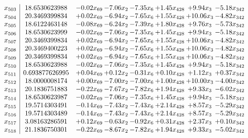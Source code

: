 \documentclass[8pt]{article}
\begin{document}
\[\begin{array}{c| c c@{\hskip 2pt} c@{\hskip 2pt} c@{\hskip 2pt} c@{\hskip 2pt} c@{\hskip 2pt} c@{\hskip 2pt} }
 x_{503}   &  18.6530623988 & -0.02 x_{69} & -7.06 x_{2} & -7.35 x_{6} & +  1.45 x_{428} & +  9.94 x_{3} & -5.18 x_{342}\\
 x_{504}   &  20.3469399834 & +  0.02 x_{69} & -6.94 x_{2} & -7.65 x_{6} & +  1.55 x_{428} & + 10.06 x_{3} & -4.82 x_{342}\\
 x_{505}   &  18.6122463148 & -0.08 x_{69} & -6.24 x_{2} & -7.39 x_{6} & +  1.80 x_{428} & +  9.76 x_{3} & -5.73 x_{342}\\
 x_{506}   &  18.6530623999 & -0.02 x_{69} & -7.06 x_{2} & -7.35 x_{6} & +  1.45 x_{428} & +  9.94 x_{3} & -5.18 x_{342}\\
 x_{507}   &  20.3469399834 & +  0.02 x_{69} & -6.94 x_{2} & -7.65 x_{6} & +  1.55 x_{428} & + 10.06 x_{3} & -4.82 x_{342}\\
 x_{508}   &  20.3469400223 & +  0.02 x_{69} & -6.94 x_{2} & -7.65 x_{6} & +  1.55 x_{428} & + 10.06 x_{3} & -4.82 x_{342}\\
 x_{509}   &  20.3469399834 & +  0.02 x_{69} & -6.94 x_{2} & -7.65 x_{6} & +  1.55 x_{428} & + 10.06 x_{3} & -4.82 x_{342}\\
 x_{510}   &  18.6530623988 & -0.02 x_{69} & -7.06 x_{2} & -7.35 x_{6} & +  1.45 x_{428} & +  9.94 x_{3} & -5.18 x_{342}\\
 x_{511}   &  0.693877626995 & +  0.04 x_{69} & +  0.12 x_{2} & -0.31 x_{6} & +  0.10 x_{428} & +  1.12 x_{3} & +  0.37 x_{342}\\
 x_{512}   &  18.0000008174 & +  0.00 x_{69} & -7.00 x_{2} & -7.00 x_{6} & +  1.00 x_{428} & + 10.00 x_{3} & -4.00 x_{342}\\
 x_{513}   &  20.1836751883 & -0.22 x_{69} & -7.67 x_{2} & -7.82 x_{6} & +  1.94 x_{428} & +  9.33 x_{3} & -6.02 x_{342}\\
 x_{514}   &  18.6530623987 & -0.02 x_{69} & -7.06 x_{2} & -7.35 x_{6} & +  1.45 x_{428} & +  9.94 x_{3} & -5.18 x_{342}\\
 x_{515}   &  19.5714303491 & -0.14 x_{69} & -7.43 x_{2} & -7.43 x_{6} & +  2.14 x_{428} & +  8.57 x_{3} & -5.29 x_{342}\\
 x_{516}   &  19.5714303489 & -0.14 x_{69} & -7.43 x_{2} & -7.43 x_{6} & +  2.14 x_{428} & +  8.57 x_{3} & -5.29 x_{342}\\
 x_{517}   &  3.08163286591 & +  0.12 x_{69} & -0.63 x_{2} & -0.92 x_{6} & +  0.31 x_{428} & +  2.37 x_{3} & +  0.10 x_{342}\\
 x_{518}   &  21.1836750301 & -0.22 x_{69} & -8.67 x_{2} & -7.82 x_{6} & +  1.94 x_{428} & +  9.33 x_{3} & -5.02 x_{342}\\

\end{array}\]
\end{document}
